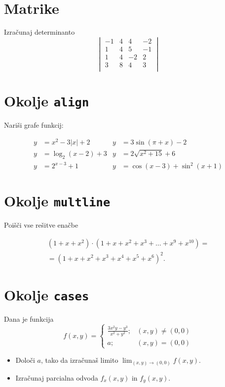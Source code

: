 \documentclass[a4paper,12pt]{article}
\begin{document}
\section*{Matrike}
Izračunaj determinanto
\[
\begin{vmatrix}
    -1 & 4 & 4 & -2 \\
    1 & 4 & 5 & -1 \\
    1 & 4 & -2 & 2 \\
    3 & 8 & 4 & 3 \\
\end{vmatrix}
\]
\section*{Okolje \texttt{align}}
Nariši grafe funkcij:

\begin{align*}
y &= x^2 - 3|x| + 2  &  y &= 3 \sin(\pi+x) - 2\\
y &= \log_2(x-2) + 3 &  y               &= 2 \sqrt{x^2+15} + 6\\
y &= 2^{x-3} + 1     &  y &= \cos(x-3) + \sin^2(x+1)
\end{align*}


\section*{Okolje \texttt{multline}}
Poišči vse rešitve enačbe

\begin{multline*}
   (1+x+x^2) \cdot (1+x+x^2+x^3+\ldots+x^9+x^{10}) =\\
=(1+x+x^2+x^3+x^4+x^5+x^6)^2.
\end{multline*}

\section*{Okolje \texttt{cases}}
Dana je funkcija
\[
f(x,y)=
\begin{cases}
    \frac{3x^2y-y^3}{x^2+y^2}; &(x,y)\ne(0,0)\\
    a; &(x,y)=(0,0)
\end{cases}
\]
\begin{itemize}
\item Določi \(a\), tako da izračunaš limito \( \lim_{(x,y)\to(0,0)} f(x,y) \).
\item Izračunaj parcialna odvoda \(f_x(x,y)\) in \(f_y(x,y)\).
\end{itemize}
\end{document}
